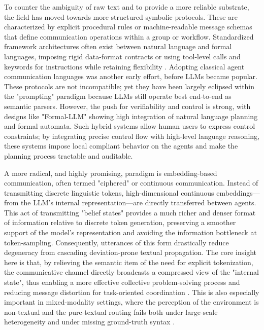 \documentclass[11pt,a4paper]{article}
\begin{document}
To counter the ambiguity of raw text and to provide a more reliable substrate, the field has moved towards more structured symbolic protocols. These are characterized by explicit procedural rules or machine-readable message schemas that define communication operations within a group or workflow. Standardized framework architectures often exist between natural language and formal languages, imposing rigid data-format contracts or using tool-level calls and keywords for instructions while retaining flexibility \cite{arxiv:2307.02485v2,arxiv:2405.14314v2}. Adopting classical agent communication languages was another early effort, before LLMs became popular. These protocols are not incompatible; yet they have been largely eclipsed within the "prompting" paradigm because LLMs still operate best end-to-end as semantic parsers. However, the push for verifiability and control is strong, with designs like "Formal-LLM" \cite{arxiv:2402.00798v2} showing high integration of natural language planning and formal automata. Such hybrid systems allow human users to express control constraints; by integrating precise control flow with high-level language reasoning, these systems impose local compliant behavior on the agents and make the planning process tractable and auditable.

A more radical, and highly promising, paradigm is embedding-based communication, often termed "ciphered" or continuous communication. Instead of transmitting discrete linguistic tokens, high-dimensional continuous embeddings---from the LLM's internal representation---are directly transferred between agents. This act of transmitting "belief states" provides a much richer and denser format of information relative to discrete token generation, preserving a smoother support of the model's representation and avoiding the information bottleneck at token-sampling. Consequently, utterances of this form drastically reduce degeneracy from cascading deviation-prone textual propagation. The core insight here is that, by relieving the semantic item of the need for explicit tokenization, the communicative channel directly broadcasts a compressed view of the "internal state", thus enabling a more effective collective problem-solving process \cite{arxiv:2005.07064v1} and reducing message distortion for task-oriented coordination \cite{arxiv:2310.06500v1}. This is also especially important in mixed-modality settings, where the perception of the environment is non-textual \cite{arxiv:2402.15116v1} and the pure-textual routing fails both under large-scale heterogeneity and under missing ground-truth syntax \cite{arxiv:2407.07061v2}.
\end{document}
